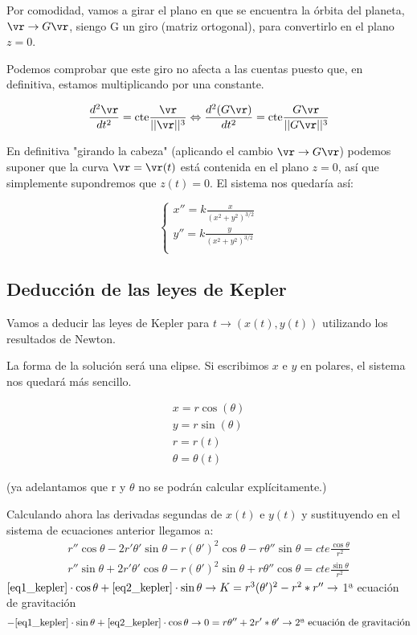 Por comodidad, vamos a girar el plano en que se encuentra la órbita del planeta, $\vr \rightarrow G\vr$, siengo G un giro (matriz ortogonal), para convertirlo en el plano $z=0$.

Podemos comprobar que este giro no afecta a las cuentas puesto que, en definitiva, estamos multiplicando por una constante.

$$\frac{d^2\vr}{dt^2} = \text{cte}\frac{\vr}{||\vr||^3} \Leftrightarrow \frac{d^2(G\vr)}{dt^2} = \text{cte}\frac{G\vr}{||G\vr||^3}$$

En definitiva "girando la cabeza" (aplicando el cambio $\vr \rightarrow G\vr$) podemos suponer que la curva $\vr = \vr(t)$ está contenida en el plano $z = 0$, así que simplemente supondremos que $z(t) = 0$. El sistema nos quedaría así:


$$
\begin{cases}
 x'' = k\frac{x}{(x^2 + y^2)^{3/2}}\\
 y'' = k\frac{y}{(x^2 + y^2)^{3/2}}\\
\end{cases}
$$

\subsection{Deducción de las leyes de Kepler}

Vamos a deducir las leyes de Kepler para $t \rightarrow (x(t), y(t))$ utilizando los resultados de Newton.

La forma de la solución será una elipse.
Si escribimos $x$ e $y$ en polares, el sistema nos quedará más sencillo.

$$\begin{array}{c}
x = r\cos(\theta)\\
y = r\sin(\theta) \\
r = r(t) \\
\theta = \theta(t)
\end{array}
$$

(ya adelantamos que r y $\theta$ no se podrán calcular explícitamente.)

Calculando ahora las derivadas segundas de $x(t)$ e $y(t)$ y sustituyendo en el sistema de ecuaciones anterior llegamos a:
\begin{gather}
r''\cos\theta - 2r'\theta'\sin\theta - r(\theta')^2\cos\theta - r\theta''\sin\theta = cte \frac{\cos\theta}{r^2} \label{eq1_kepler}\\
r''\sin\theta + 2r'\theta'\cos\theta - r(\theta')^2\sin\theta + r\theta''\cos\theta = cte \frac{\sin\theta}{r^2} \label{eq2_kepler}
\end{gather}
$\eqref{eq1_kepler}\cdot\cos\theta + \eqref{eq2_kepler}\cdot\sin\theta \rightarrow K= r^3(\theta')^2 - r^2*r'' \rightarrow$ 1ª ecuación de gravitación
$$-\eqref{eq1_kepler}\cdot\sin\theta + \eqref{eq2_kepler}\cdot\cos\theta \rightarrow 0= r \theta'' + 2r' * \theta' \rightarrow \text{2ª ecuación de gravitación}$$


